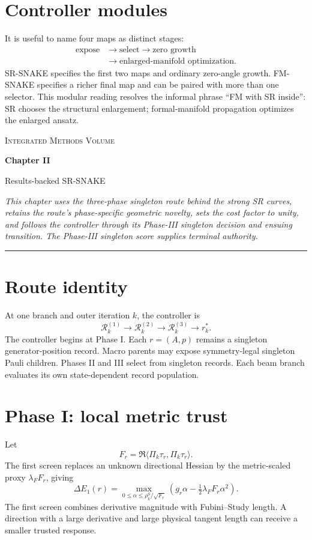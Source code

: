\documentclass[10pt,twocolumn]{article}
\newcommand{\chapterfront}[3]{%
  \begingroup
  \centering
  {\small\scshape Integrated Methods Volume\par}
  \vspace{0.45em}
  {\Large\bfseries #1\par}
  \vspace{0.25em}
  {\large #2\par}
  \vspace{0.65em}
  \begin{minipage}{0.94\columnwidth}
    \small\itshape #3
  \end{minipage}\par
  \vspace{0.75em}
  \hrule
  \vspace{0.75em}
  \endgroup
}
\begin{document}
\section*{Controller modules}

It is useful to name four maps as distinct stages:
\begin{equation}
\begin{aligned}
\text{expose}&\longrightarrow\text{select}
\longrightarrow\text{zero growth}\\
&\longrightarrow\text{enlarged-manifold optimization}.
\end{aligned}
\label{eq:four-modules}
\end{equation}
SR-SNAKE specifies the first two maps and ordinary zero-angle growth. FM-SNAKE
specifies a richer final map and can be paired with more than one selector.
This modular reading resolves the informal phrase ``FM with SR inside'': SR
chooses the structural enlargement; formal-manifold propagation optimizes the
enlarged ansatz.

\clearpage
\chapterfront
{Chapter II}
{Results-backed SR-SNAKE}
{This chapter uses the three-phase singleton route behind the strong SR curves,
retains the route's phase-specific geometric novelty, sets the cost factor to
unity, and follows the controller through its Phase-III singleton decision and
ensuing transition. The Phase-III singleton score supplies terminal authority.}

\section*{Route identity}

At one branch and outer iteration \(k\), the controller is
\begin{equation}
\mathcal R_k^{(1)}\longrightarrow
\mathcal R_k^{(2)}\longrightarrow
\mathcal R_k^{(3)}\longrightarrow r_k^*.
\label{eq:sr-route}
\end{equation}
The controller begins at Phase I. Each \(r=(A,p)\) remains a singleton
generator-position record. Macro parents may expose symmetry-legal singleton
Pauli children. Phases II and III select from singleton records. Each beam
branch evaluates its own state-dependent record population.

\section*{Phase I: local metric trust}

Let
\begin{equation}
F_r=\Re\langle\Pi_k\tau_r,\Pi_k\tau_r\rangle.
\label{eq:sr-F-raw}
\end{equation}
The first screen replaces an unknown directional Hessian by the metric-scaled
proxy \(\lambda_FF_r\), giving
\begin{equation}
\Delta E_1(r)=
\max_{0\leq\alpha\leq\rho_k^{\mathrm S}/\sqrt{F_r}}
\left(g_r\alpha-\tfrac12\lambda_FF_r\alpha^2\right).
\label{eq:sr-phase1}
\end{equation}
The first screen combines derivative magnitude with Fubini--Study length. A
direction with a large derivative and large physical tangent length can receive
a smaller trusted response.
\end{document}
